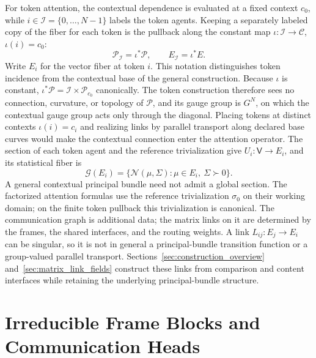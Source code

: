 \documentclass[twoside,11pt]{article}
\begin{document}
For token attention, the contextual dependence is evaluated at a fixed context \(c_0\), while \(i\in\mathcal I=\{0,\ldots,N-1\}\) labels the token agents. Keeping a separately labeled copy of the fiber for each token is the pullback along the constant map \(\iota:\mathcal I\to\mathcal C\), \(\iota(i)=c_0\):
\begin{equation}
\mathcal P_{\mathcal I}=\iota^*\mathcal P,
\qquad E_{\mathcal I}=\iota^*E.
\label{eq:token_bundle_pullback}
\end{equation}
Write \(E_i\) for the vector fiber at token \(i\). This notation distinguishes token incidence from the contextual base of the general construction. Because \(\iota\) is constant, \(\iota^*\mathcal P=\mathcal I\times\mathcal P_{c_0}\) canonically. The token construction therefore sees no connection, curvature, or topology of \(\mathcal P\), and its gauge group is \(G^N\), on which the contextual gauge group acts only through the diagonal. Placing tokens at distinct contexts \(\iota(i)=c_i\) and realizing links by parallel transport along declared base curves would make the contextual connection enter the attention operator. The section of each token agent and the reference trivialization give \(U_i:\mathsf V\to E_i\), and its statistical fiber is
\begin{equation}
\mathcal G(E_i)=\{\mathcal N(\mu,\Sigma):\mu\in E_i,\ \Sigma\succ0\}.
\label{eq:overview_statistical_fiber}
\end{equation}
A general contextual principal bundle need not admit a global section. The factorized attention formulas use the reference trivialization \(\sigma_0\) on their working domain; on the finite token pullback this trivialization is canonical. The communication graph is additional data; the matrix links on it are determined by the frames, the shared interfaces, and the routing weights. A link \(L_{ij}:E_j\to E_i\) can be singular, so it is not in general a principal-bundle transition function or a group-valued parallel transport. Sections~\ref{sec:construction_overview} and~\ref{sec:matrix_link_fields} construct these links from comparison and content interfaces while retaining the underlying principal-bundle structure.

\section{Irreducible Frame Blocks and Communication Heads}
\label{sec:heads_irreps}
\end{document}
